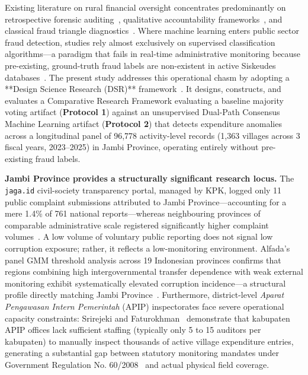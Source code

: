 \documentclass[runningheads]{llncs}
\begin{document}
Existing literature on rural financial oversight concentrates predominantly on retrospective forensic auditing~\cite{ref4}, qualitative accountability frameworks~\cite{ref5}, and classical fraud triangle diagnostics~\cite{ref6}. Where machine learning enters public sector fraud detection, studies rely almost exclusively on supervised classification algorithms---a paradigm that fails in real-time administrative monitoring because pre-existing, ground-truth fraud labels are non-existent in active Siskeudes databases~\cite{ref13,ref14}. The present study addresses this operational chasm by adopting a **Design Science Research (DSR)** framework~\cite{ref5,ref10}. It designs, constructs, and evaluates a Comparative Research Framework evaluating a baseline majority voting artifact (\textbf{Protocol 1}) against an unsupervised Dual-Path Consensus Machine Learning artifact (\textbf{Protocol 2}) that detects expenditure anomalies across a longitudinal panel of 96,778 activity-level records (1,363 villages across 3 fiscal years, 2023--2025) in Jambi Province, operating entirely without pre-existing fraud labels.

\textbf{Jambi Province provides a structurally significant research locus.} The \texttt{jaga.id} civil-society transparency portal, managed by KPK, logged only 11 public complaint submissions attributed to Jambi Province---accounting for a mere 1.4\% of 761 national reports---whereas neighbouring provinces of comparable administrative scale registered significantly higher complaint volumes~\cite{ref26}. A low volume of voluntary public reporting does not signal low corruption exposure; rather, it reflects a low-monitoring environment. Alfada's panel GMM threshold analysis across 19 Indonesian provinces confirms that regions combining high intergovernmental transfer dependence with weak external monitoring exhibit systematically elevated corruption incidence---a structural profile directly matching Jambi Province~\cite{ref27}. Furthermore, district-level \textit{Aparat Pengawasan Intern Pemerintah} (APIP) inspectorates face severe operational capacity constraints: Srirejeki and Faturokhman~\cite{ref12} demonstrate that kabupaten APIP offices lack sufficient staffing (typically only 5 to 15 auditors per kabupaten) to manually inspect thousands of active village expenditure entries, generating a substantial gap between statutory monitoring mandates under Government Regulation No. 60/2008~\cite{ref33} and actual physical field coverage.
\end{document}
